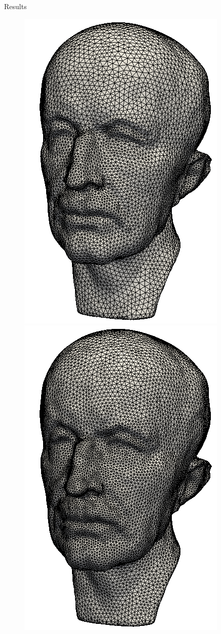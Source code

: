 \documentclass{beamer}
\begin{document}
\begin{frame}[plain]{Results}
\begin{figure}
\begin{minipage}{0.31\textwidth}
    \end{minipage}
    \begin{minipage}{.31\textwidth}
      \centering
      \includegraphics[width=0.7\linewidth]{../image/mpr_b.png}
    \end{minipage} 
    \begin{minipage}{0.31\textwidth}
      \centering
      \includegraphics[width=0.7\linewidth]{../image/mpr_c.png}

\end{minipage}
\end{figure}
\end{frame}
\end{document}
